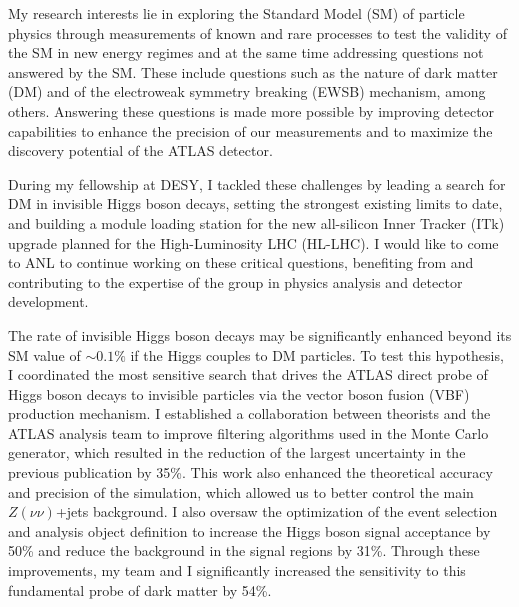 \documentclass[a4paper]{article}
\begin{document}
\thispagestyle{fancy} 
 \lfoot{} \rfoot{\bf \thepage} \cfoot{}

\fontsize{11}{14}
\selectfont



My research interests lie in exploring the Standard Model (SM) of particle physics through measurements of known and rare processes
to test the validity of the SM in new energy regimes and at the same time addressing questions not answered by the SM.
These include questions such as the nature of dark matter (DM) and of the electroweak symmetry breaking (EWSB) mechanism, among others.
Answering these questions is made more possible by improving detector capabilities to enhance the precision of our measurements and to maximize the discovery potential of the ATLAS detector.

During my fellowship at DESY, I tackled these challenges by leading a search for DM in invisible Higgs boson decays, setting the strongest existing limits to date, and building a module loading station for the new all-silicon Inner Tracker (ITk) upgrade planned for the High-Luminosity LHC (HL-LHC). I would like to come to ANL to continue working on these critical questions, benefiting from and contributing to the expertise of the group in physics analysis and detector development.

The rate of invisible Higgs boson decays may be significantly enhanced beyond its SM value of $\sim0.1\%$ if the Higgs couples to DM particles.
To test this hypothesis, I coordinated the most sensitive search that drives the ATLAS direct probe of Higgs boson decays to invisible particles via the vector boson fusion (VBF) production mechanism. I established a collaboration between theorists and the ATLAS analysis team to improve
filtering algorithms used in the Monte Carlo generator, which resulted in the reduction of the largest uncertainty in the previous publication by 35\%. This work also enhanced the theoretical accuracy and precision of the simulation, which allowed us to better control the main $Z\left(\nu\nu\right)$+jets background.
I also oversaw the optimization of the event selection and analysis object definition to increase the Higgs boson signal acceptance by 50\% and reduce the background in the signal regions by 31\%. Through these improvements, my team and I significantly increased the sensitivity to this fundamental probe of dark matter by 54\%.
\end{document}
